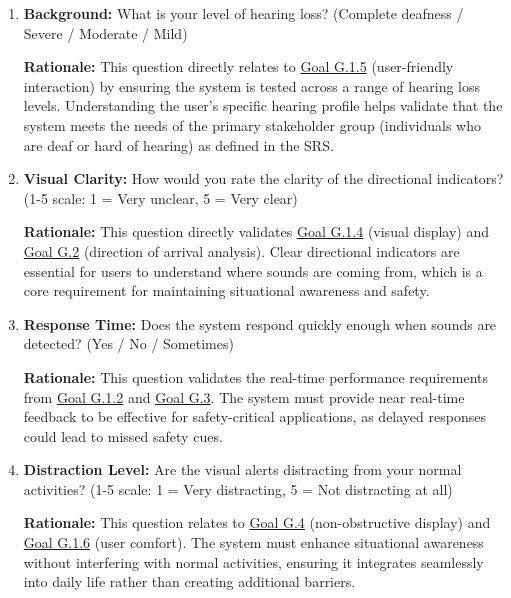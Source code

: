 \documentclass[12pt, titlepage]{article}
\begin{document}
\begin{enumerate}
    \item \textbf{Background:} What is your level of hearing loss? (Complete deafness / Severe / Moderate / Mild)
    
    \textbf{Rationale:} This question directly relates to \hyperref[goal:user_friendly_interaction]{Goal G.1.5} (user-friendly interaction) by ensuring the system is tested across a range of hearing loss levels. Understanding the user's specific hearing profile helps validate that the system meets the needs of the primary stakeholder group (individuals who are deaf or hard of hearing) as defined in the SRS.
    
    \item \textbf{Visual Clarity:} How would you rate the clarity of the directional indicators? (1-5 scale: 1 = Very unclear, 5 = Very clear)
    
    \textbf{Rationale:} This question directly validates \hyperref[goal:visual_display]{Goal G.1.4} (visual display) and \hyperref[goal:audio_direction_analysis]{Goal G.2} (direction of arrival analysis). Clear directional indicators are essential for users to understand where sounds are coming from, which is a core requirement for maintaining situational awareness and safety.
    
    \item \textbf{Response Time:} Does the system respond quickly enough when sounds are detected? (Yes / No / Sometimes)
    
    \textbf{Rationale:} This question validates the real-time performance requirements from \hyperref[goal:audio_direction_analysis]{Goal G.1.2} and \hyperref[goal:audio_identification_analysis]{Goal G.3}. The system must provide near real-time feedback to be effective for safety-critical applications, as delayed responses could lead to missed safety cues.
    
    \item \textbf{Distraction Level:} Are the visual alerts distracting from your normal activities? (1-5 scale: 1 = Very distracting, 5 = Not distracting at all)
    
    \textbf{Rationale:} This question relates to \hyperref[goal:visual_display]{Goal G.4} (non-obstructive display) and \hyperref[goal:user_comfort]{Goal G.1.6} (user comfort). The system must enhance situational awareness without interfering with normal activities, ensuring it integrates seamlessly into daily life rather than creating additional barriers.
    

\end{enumerate}
\end{document}
